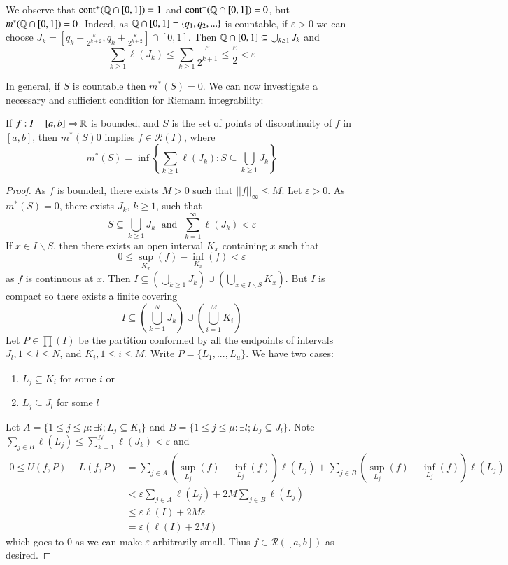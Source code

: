 \begin{eg}
    We observe that $\text{cont}^+(\mathbb Q\cap [0,1]) = 1$ and $\text{cont}^-(\mathbb Q\cap [0,1]) = 0$, but $m^*(\mathbb Q\cap [0,1]) = 0$. Indeed, as $\mathbb Q\cap [0,1] = \{q_1,q_2,...\}$ is countable, if $\varepsilon > 0$ we can choose $J_k = \left[q_k - \frac{\varepsilon}{2^{k+2}}, q_k + \frac{\varepsilon}{2^{k+2}}\right]\cap[0,1]$. Then $\mathbb Q\cap[0,1] \subseteq \bigcup_{k\geq 1}J_k$ and $$\sum_{k\geq 1}\ell(J_k) \leq \sum_{k\geq 1}\frac{\varepsilon}{2^{k+1}} \leq \frac{\varepsilon}{2} < \varepsilon$$ 
\end{eg}

In general, if $S$ is countable then $m^*(S) = 0$. We can now investigate a necessary and sufficient condition for Riemann integrability: 

\begin{prop}\label{prop:4.2.12}
    If $f:I=[a,b]\rightarrow \mathbb R$ is bounded, and $S$ is the set of points of discontinuity of $f$ in $[a,b]$, then $m^*(S) 0$ implies $f \in \mathcal{R}(I)$, where $$m^*(S) = \inf\left\{\sum_{k\geq 1}\ell(J_k):S\subseteq \bigcup_{k\geq 1}J_k\right\}$$
\end{prop}
\begin{proof}
    As $f$ is bounded, there exists $M > 0$ such that $||f||_{\infty} \leq M$. Let $\varepsilon > 0$. As $m^*(S) = 0$, there exists $J_k$, $k\geq 1$, such that $$S \subseteq \bigcup_{k\geq 1}J_k\;\text{ and }\;\sum_{k=1}^{\infty}\ell(J_k) < \varepsilon$$ If $x \in I\backslash S$, then there exists an open interval $K_x$ containing $x$ such that $$0 \leq \sup_{K_x}(f) - \inf_{K_x}(f) < \varepsilon$$ as $f$ is continuous at $x$. Then $I \subseteq \left(\bigcup_{k\geq 1}J_k\right) \cup\left(\bigcup_{x \in I\backslash S}K_x\right)$. But $I$ is compact so there exists a finite covering $$I \subseteq \left(\bigcup_{k=1}^NJ_k\right) \cup\left(\bigcup_{i=1}^MK_i\right)$$ Let $P \in \prod(I)$ be the partition conformed by all the endpoints of intervals $J_l, 1 \leq l \leq N$, and $K_i, 1 \leq i \leq M$. Write $P = \{L_1,...,L_{\mu}\}$. We have two cases: \begin{enumerate}
        \item $L_j \subseteq K_i$ for some $i$ or 
        \item $L_j \subseteq J_l$ for some $l$
    \end{enumerate}
    Let $A = \{1\leq j\leq \mu:\exists i;L_j \subseteq K_i\}$ and $B = \{1\leq j \leq \mu:\exists l;L_j\subseteq J_l\}$. Note $\sum_{j\in B}\ell(L_j) \leq \sum_{k=1}^N\ell(J_k)<\varepsilon$ and \begin{align*}
        0 \leq U(f,P) - L(f,P) &= \sum_{j \in A}\left(\sup_{L_j}(f) - \inf_{L_j}(f)\right)\ell(L_j) + \sum_{j\in B}\left(\sup_{L_j}(f) - \inf_{L_j}(f)\right)\ell(L_j) \\
        &< \varepsilon\sum_{j\in A}\ell(L_j) + 2M\sum_{j\in B}\ell(L_j) \\
        &\leq \varepsilon \ell(I) + 2M\varepsilon \\
        &= \varepsilon(\ell(I)+2M)
    \end{align*}
    which goes to $0$ as we can make $\varepsilon$ arbitrarily small. Thus $f \in \mathcal{R}([a,b])$ as desired.
\end{proof}


